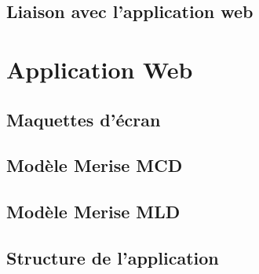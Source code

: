 \documentclass[a4paper]{article}
\begin{document}
	\subsection{Liaison avec l'application web}
		
		
\newpage
\section{Application Web}
	\subsection{Maquettes d'écran}
		
	\subsection{Modèle Merise MCD}
		
	\subsection{Modèle Merise MLD}
		
	\subsection{Structure de l'application}
		

\newpage
\tableofcontents
\end{document}
